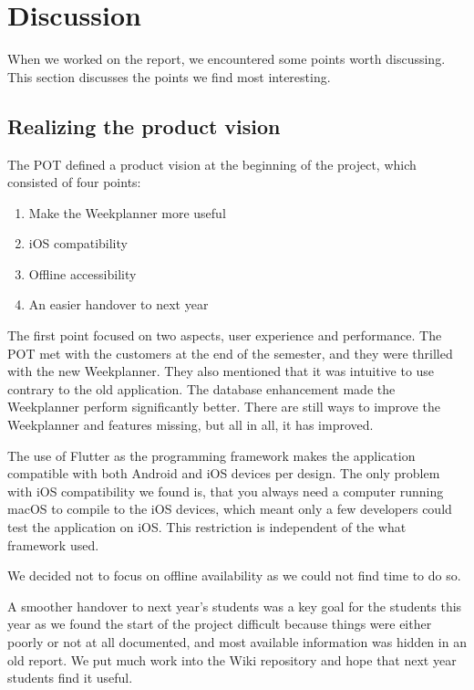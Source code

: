 \section{Discussion}

When we worked on the report, we encountered some points worth discussing. This section discusses the points we find most interesting. 

\subsection{Realizing the product vision}
The \gls{POT} defined a product vision at the beginning of the project, which consisted of four points:

\begin{enumerate}
    \item Make the Weekplanner more useful
    \item iOS compatibility
    \item Offline accessibility
    \item An easier handover to next year
\end{enumerate}

The first point focused on two aspects, user experience and performance. The \gls{POT} met with the customers at the end of the semester, and they were thrilled with the new Weekplanner. They also mentioned that it was intuitive to use contrary to the old application. The database enhancement made the Weekplanner perform significantly better. There are still ways to improve the Weekplanner and features missing, but all in all, it has improved.

The use of Flutter as the programming framework makes the application compatible with both Android and iOS devices per design. The only problem with iOS compatibility we found is, that you always need a computer running macOS to compile to the iOS devices, which meant only a few developers could test the application on iOS. This restriction is independent of the what framework used.

We decided not to focus on offline availability as we could not find time to do so.

A smoother handover to next year's students was a key goal for the students this year as we found the start of the project difficult because things were either poorly or not at all documented, and most available information was hidden in an old report. We put much work into the Wiki repository and hope that next year students find it useful.

